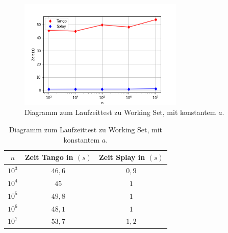\documentclass[a4paper,12pt]{article}
\begin{document}
\begin{figure}[H]
	\centering
	\includegraphics[width=0.7\textwidth]{"Medien/laufzeittest/diagramm/workingset"}
	\caption{Diagramm zum Laufzeittest zu Working Set, mit konstantem $a$.}
\end{figure}
\begin{table}[H]
	\begin{center}
		\begin{tabular}[c]{|c|c|c|}
			\hline
			$n$ & Zeit Tango in $\left(s\right)$ &Zeit Splay in $\left(s\right)$ \\
			\hline
			$10^3$ & $46,6$ &$0,9$ \\
			\hline
			$10^4$  & $45$ &$1$  \\
			\hline
			$10^5$  & $49,8$ &$1$  \\
			\hline
			$10^6$  & $48,1$ &$1$  \\
			\hline
			$10^7$  & $53,7$ &$1,2$  \\
			\hline
		\end{tabular}
		\caption{Diagramm zum Laufzeittest zu Working Set, mit konstantem $a$.} 
	\end{center}
\end{table}
\end{document}
